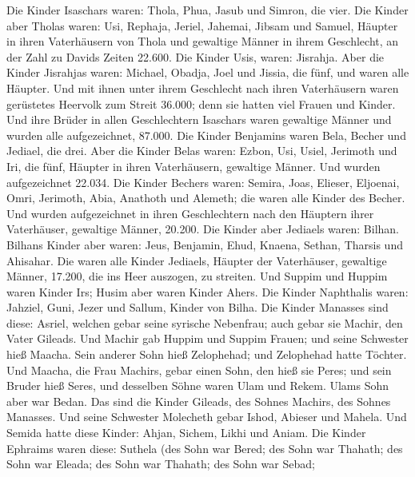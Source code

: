  Die Kinder Isaschars waren: Thola, Phua, Jasub und
Simron, die vier.  Die Kinder aber Tholas waren: Usi,
Rephaja, Jeriel, Jahemai, Jibsam und Samuel, Häupter in ihren
Vaterhäusern von Thola und gewaltige Männer in ihrem Geschlecht, an der
Zahl zu Davids Zeiten 22.600.  Die Kinder Usis, waren:
Jisrahja. Aber die Kinder Jisrahjas waren: Michael, Obadja, Joel und
Jissia, die fünf, und waren alle Häupter.  Und mit ihnen
unter ihrem Geschlecht nach ihren Vaterhäusern waren gerüstetes Heervolk
zum Streit 36.000; denn sie hatten viel Frauen und Kinder.
 Und ihre Brüder in allen Geschlechtern Isaschars waren
gewaltige Männer und wurden alle aufgezeichnet, 87.000. 
Die Kinder Benjamins waren Bela, Becher und Jediael, die drei.
 Aber die Kinder Belas waren: Ezbon, Usi, Usiel, Jerimoth
und Iri, die fünf, Häupter in ihren Vaterhäusern, gewaltige Männer. Und
wurden aufgezeichnet 22.034.  Die Kinder Bechers waren:
Semira, Joas, Elieser, Eljoenai, Omri, Jerimoth, Abia, Anathoth und
Alemeth; die waren alle Kinder des Becher.  Und wurden
aufgezeichnet in ihren Geschlechtern nach den Häuptern ihrer
Vaterhäuser, gewaltige Männer, 20.200.  Die Kinder aber
Jediaels waren: Bilhan. Bilhans Kinder aber waren: Jeus, Benjamin, Ehud,
Knaena, Sethan, Tharsis und Ahisahar.  Die waren alle
Kinder Jediaels, Häupter der Vaterhäuser, gewaltige Männer, 17.200, die
ins Heer auszogen, zu streiten.  Und Suppim und Huppim
waren Kinder Irs; Husim aber waren Kinder Ahers.  Die
Kinder Naphthalis waren: Jahziel, Guni, Jezer und Sallum, Kinder von
Bilha.  Die Kinder Manasses sind diese: Asriel, welchen
gebar seine syrische Nebenfrau; auch gebar sie Machir, den Vater
Gileads.  Und Machir gab Huppim und Suppim Frauen; und
seine Schwester hieß Maacha. Sein anderer Sohn hieß Zelophehad; und
Zelophehad hatte Töchter.  Und Maacha, die Frau Machirs,
gebar einen Sohn, den hieß sie Peres; und sein Bruder hieß Seres, und
desselben Söhne waren Ulam und Rekem.  Ulams Sohn aber
war Bedan. Das sind die Kinder Gileads, des Sohnes Machirs, des Sohnes
Manasses.  Und seine Schwester Molecheth gebar Ishod,
Abieser und Mahela.  Und Semida hatte diese Kinder:
Ahjan, Sichem, Likhi und Aniam.  Die Kinder Ephraims
waren diese: Suthela (des Sohn war Bered; des Sohn war Thahath; des Sohn
war Eleada; des Sohn war Thahath;  des Sohn war Sebad;
